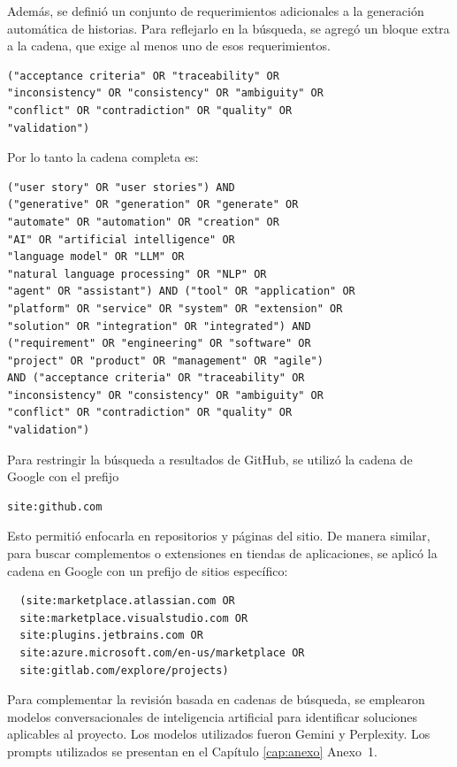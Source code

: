 Además, se definió un conjunto de requerimientos adicionales a la generación automática de historias. Para reflejarlo en la búsqueda, se agregó un bloque extra a la cadena, que exige al menos uno de esos requerimientos.

\begin{verbatim}
("acceptance criteria" OR "traceability" OR
"inconsistency" OR "consistency" OR "ambiguity" OR
"conflict" OR "contradiction" OR "quality" OR
"validation")  
\end{verbatim}

Por lo tanto la cadena completa es:
\begin{verbatim} 
("user story" OR "user stories") AND
("generative" OR "generation" OR "generate" OR
"automate" OR "automation" OR "creation" OR 
"AI" OR "artificial intelligence" OR 
"language model" OR "LLM" OR
"natural language processing" OR "NLP" OR
"agent" OR "assistant") AND ("tool" OR "application" OR
"platform" OR "service" OR "system" OR "extension" OR
"solution" OR "integration" OR "integrated") AND
("requirement" OR "engineering" OR "software" OR
"project" OR "product" OR "management" OR "agile")
AND ("acceptance criteria" OR "traceability" OR
"inconsistency" OR "consistency" OR "ambiguity" OR
"conflict" OR "contradiction" OR "quality" OR
"validation")
\end{verbatim}

Para restringir la búsqueda a resultados de GitHub, se utilizó la cadena de Google con el prefijo 
\begin{verbatim}
site:github.com
\end{verbatim} 

Esto permitió enfocarla en repositorios y páginas del sitio. De manera similar, para buscar complementos o extensiones en tiendas de aplicaciones, se aplicó la cadena en Google con un prefijo de sitios específico:
\begin{verbatim}
  (site:marketplace.atlassian.com OR 
  site:marketplace.visualstudio.com OR
  site:plugins.jetbrains.com OR
  site:azure.microsoft.com/en-us/marketplace OR 
  site:gitlab.com/explore/projects)  
\end{verbatim}


Para complementar la revisión basada en cadenas de búsqueda, se emplearon modelos conversacionales de inteligencia artificial para identificar soluciones aplicables al proyecto. Los modelos utilizados fueron Gemini y Perplexity. Los prompts utilizados se presentan en el Capítulo \ref{cap:anexo} Anexo~1.

